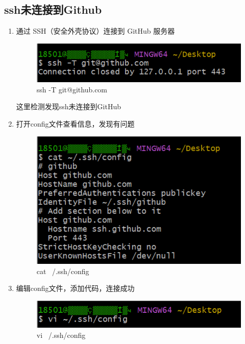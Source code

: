 \documentclass{ctexart}
\begin{document}
\subsection{ssh未连接到Github}
\begin{enumerate}
    \item 通过 SSH（安全外壳协议）连接到 GitHub 服务器\\
    \begin{figure}[H]
        \centering
        \includegraphics[width=18cm]{image.png}
        \caption{ssh -T git@github.com}
        \label{fig:21}
    \end{figure}
    这里检测发现ssh未连接到GitHub
    \item 打开config文件查看信息，发现有问题
    \begin{figure}[H]
        \centering
        \includegraphics[width=18cm]{image copy.png}
        \caption{cat ~/.ssh/config}
        \label{fig:22}
    \end{figure}
    \item 编辑config文件，添加代码，连接成功
    \begin{figure}[H]
        \centering
        \includegraphics[width=18cm]{1.png}
        \caption{vi ~/.ssh/config}
        \label{fig:23}
    \end{figure}

\end{enumerate}
\end{document}
